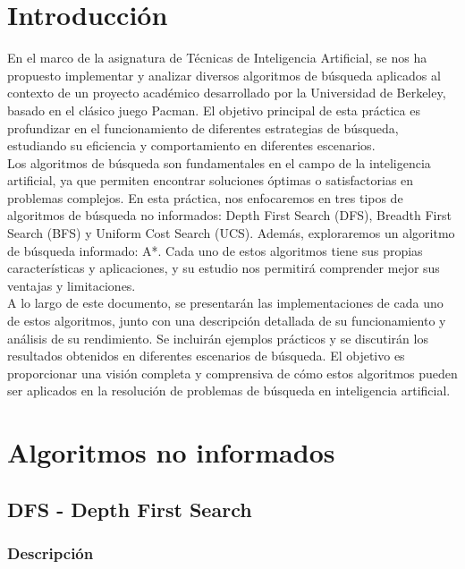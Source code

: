 \documentclass{report}
\begin{document}
    \chapter{Introducción}
      {
        En el marco de la asignatura de Técnicas de Inteligencia Artificial, se nos ha propuesto implementar y analizar diversos algoritmos de búsqueda aplicados al contexto de un proyecto académico desarrollado por la Universidad de Berkeley, basado en el clásico juego Pacman. El objetivo principal de esta práctica es profundizar en el funcionamiento de diferentes estrategias de búsqueda, estudiando su eficiencia y comportamiento en diferentes escenarios.\\

        Los algoritmos de búsqueda son fundamentales en el campo de la inteligencia artificial, ya que permiten encontrar soluciones óptimas o satisfactorias en problemas complejos. En esta práctica, nos enfocaremos en tres tipos de algoritmos de búsqueda no informados: Depth First Search (DFS), Breadth First Search (BFS) y Uniform Cost Search (UCS). Además, exploraremos un algoritmo de búsqueda informado: A*. Cada uno de estos algoritmos tiene sus propias características y aplicaciones, y su estudio nos permitirá comprender mejor sus ventajas y limitaciones.\\

        A lo largo de este documento, se presentarán las implementaciones de cada uno de estos algoritmos, junto con una descripción detallada de su funcionamiento y análisis de su rendimiento. Se incluirán ejemplos prácticos y se discutirán los resultados obtenidos en diferentes escenarios de búsqueda. El objetivo es proporcionar una visión completa y comprensiva de cómo estos algoritmos pueden ser aplicados en la resolución de problemas de búsqueda en inteligencia artificial.\\
      }
    \chapter{Algoritmos no informados}
      \section{DFS - Depth First Search}
        \subsection*{Descripción}
\end{document}
